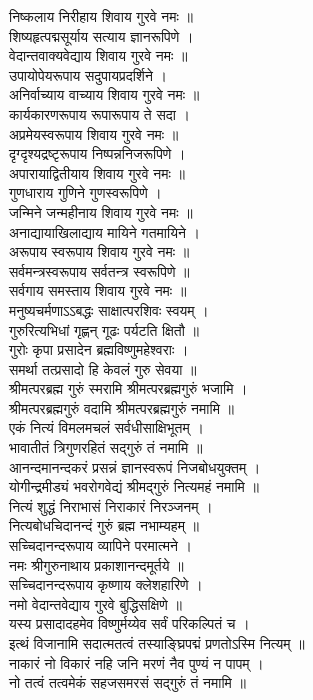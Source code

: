 निष्कलाय निरीहाय शिवाय गुरवे नमः ॥\\
शिष्यहृत्पद्मसूर्याय सत्याय ज्ञानरूपिणे ।\\[-2mm]
वेदान्तवाक्यवेद्याय शिवाय गुरवे नमः ॥\\
उपायोपेयरूपाय सदुपायप्रदर्शिने ।\\[-2mm]
अनिर्वाच्याय वाच्याय शिवाय गुरवे नमः ॥\\
कार्यकारणरूपाय रूपारूपाय ते सदा ।\\[-2mm]
अप्रमेयस्वरूपाय शिवाय गुरवे नमः ॥\\
दृग्दृश्यद्रष्टृरूपाय निष्पन्ननिजरूपिणे ।\\[-2mm]
अपारायाद्वितीयाय शिवाय गुरवे नमः ॥\\
 गुणधाराय गुणिने गुणस्वरूपिणे ।\\[-2mm]
जन्मिने जन्महीनाय शिवाय गुरवे नमः ॥\\
अनाद्यायाखिलाद्याय मायिने गतमायिने ।\\[-2mm]
अरूपाय स्वरूपाय शिवाय गुरवे नमः ॥\\
सर्वमन्त्रस्वरूपाय सर्वतन्त्र स्वरूपिणे ॥\\
सर्वगाय समस्ताय शिवाय गुरवे नमः ॥\\
मनुष्यचर्मणाऽऽबद्धः साक्षात्परशिवः स्वयम् ।\\[-2mm]
गुरुरित्यभिधां गृह्णन् गूढः पर्यटति क्षितौ ॥\\
गुरोः कृपा प्रसादेन ब्रह्मविष्णुमहेश्वराः ।\\[-2mm]
समर्था तत्प्रसादो हि केवलं गुरु सेवया ॥\\
श्रीमत्परब्रह्म गुरुं स्मरामि श्रीमत्परब्रह्मगुरुं भजामि ।\\[-2mm]
श्रीमत्परब्रह्मगुरुं वदामि श्रीमत्परब्रह्मगुरुं नमामि ॥\\
एकं नित्यं विमलमचलं सर्वधीसाक्षिभूतम् ।\\[-2mm]
भावातीतं त्रिगुणरहितं सद्गुरुं तं नमामि ॥\\
आनन्दमानन्दकरं प्रसन्नं 
ज्ञानस्वरूपं निजबोधयुक्तम् ।\\[-2mm]
योगीन्द्रमीड्यं भवरोगवेद्यं 
श्रीमद्गुरुं नित्यमहं नमामि ॥\\
नित्यं शुद्धं निराभासं निराकारं निरञ्जनम् ।\\[-2mm]
नित्यबोधचिदानन्दं गुरुं ब्रह्म नभाम्यहम् ॥\\
सच्चिदानन्दरूपाय व्यापिने परमात्मने ।\\[-2mm]
नमः श्रीगुरुनाथाय प्रकाशानन्दमूर्तये ॥\\
सच्चिदानन्दरूपाय कृष्णाय क्लेशहारिणे ।\\[-2mm]
नमो वेदान्तवेद्याय गुरवे बुद्धिसक्षिणे ॥\\
यस्य प्रसादादहमेव विष्णुर्मय्येव सर्वं परिकल्पितं च ।\\[-2mm]
इत्थं विजानामि सदात्मतत्वं तस्याङ्घ्रिपद्मं प्रणतोऽस्मि नित्यम् ॥\\
नाकारं नो विकारं नहि जनि मरणं नैव पुण्यं न पापम् ।\\[-2mm]
नो तत्वं तत्वमेकं सहजसमरसं सद्गुरुं तं नमामि ॥\\

